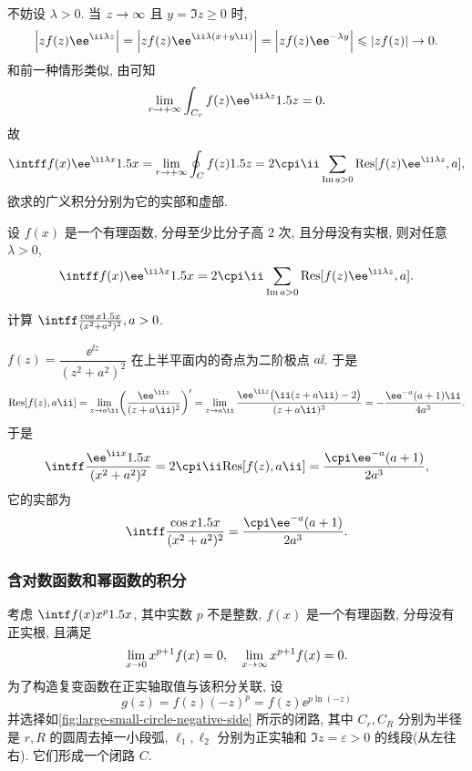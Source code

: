 不妨设 $\lambda>0$.
当 $z\rightarrow \infty$ 且 $y=\Im z\ge 0$ 时, 
  \[
     \abs{zf(z)\ee^{\ii \lambda z}}
    =\abs{zf(z)\ee^{\ii \lambda (x+y\ii)}}
    =\abs{zf(z)\ee^{-\lambda y}}
    \le \abs{zf(z)}\ra 0.
  \]
和前一种情形类似, 由\thmSA 可知
\[
  \lim_{r\ra +\infty}\int_{C_r}f(z)\ee^{\ii \lambda z}\d z=0.
\]
故
\[
   \intff f(x)\ee^{\ii \lambda x}\d x
  =\lim_{r\ra +\infty}\oint_C f(z)\d z
  =2\cpi\ii\sum_{\Im a>0}\Res[f(z)\ee^{\ii \lambda z},a],
\]
欲求的广义积分分别为它的实部和虚部.

\begin{theorem}
  \label{thm:rational-integral-exp-infinity}
  设 $f(x)$ 是一个有理函数, 分母至少比分子高 $2$ 次, 且分母没有实根, 则对任意 $\lambda>0$,
  \[
     \intff f(x)\ee^{\ii \lambda x}\d x
    =2\cpi\ii\sum_{\Im a>0}\Res[f(z)\ee^{\ii \lambda z},a].
  \]
\end{theorem}

\begin{example}
  计算 $\intff \frac{\cos x\d x}{(x^2+a^2)^2}, a>0$.
\end{example}

\begin{solution}
  $f(z)=\dfrac{\ee^{\ii z}}{(z^2+a^2)^2}$ 在上半平面内的奇点为二阶极点 $a\ii$.
  于是
  \[
     \Res[f(z),a\ii]
    =\lim_{z\ra a\ii}\biggl(\frac{\ee^{\ii z}}{(z+a\ii)^2}\biggr)'
    =\lim_{z\ra a\ii}\frac{\ee^{\ii z}\bigl(\ii(z+a\ii)-2\bigr)}{(z+a\ii)^3}
    =-\frac{\ee^{-a}(a+1)\ii}{4a^3}.
  \]
  于是
  \[
     \intff \frac{\ee^{\ii x}\d x}{(x^2+a^2)^2}
    =2\cpi\ii \Res[f(z),a\ii]=\frac{\cpi \ee^{-a}(a+1)}{2a^3},
  \]
  它的实部为
  \[
     \intff \frac{\cos x\d x}{(x^2+a^2)^2}
    =\frac{\cpi \ee^{-a}(a+1)}{2a^3}.
  \]
\end{solution}


\subsubsection{含对数函数和幂函数的积分}

考虑 $\intf f(x)x^p\d x$, 其中实数 $p$ 不是整数, $f(x)$ 是一个有理函数, 分母没有正实根, 且满足
\[
  \lim_{x\rightarrow 0} x^{p+1}f(x)=0,\quad
  \lim_{x\rightarrow \infty} x^{p+1}f(x)=0.
\]
为了构造复变函数在正实轴取值与该积分关联, 设
\[
  g(z)=f(z)(-z)^p=f(z)\ee^{p\ln(-z)}
\]
并选择如\ref{fig:large-small-circle-negative-side} 所示的闭路, 其中 $C_r,C_R$ 分别为半径是 $r,R$ 的圆周去掉一小段弧, $\ell_1,\ell_2$ 分别为正实轴和 $\Im z=\varepsilon>0$ 的线段(从左往右).
它们形成一个闭路 $C$.

